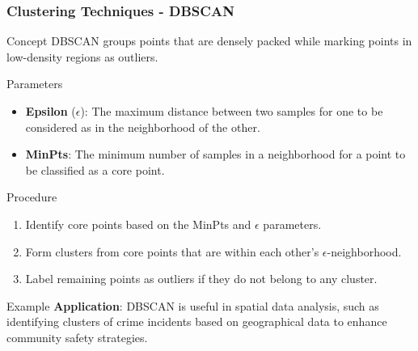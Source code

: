 \documentclass[aspectratio=169]{beamer}
\begin{document}
\begin{frame}[fragile]
    \frametitle{Clustering Techniques - DBSCAN}
    \begin{block}{Concept}
        DBSCAN groups points that are densely packed while marking points in low-density regions as outliers.
    \end{block}

    \begin{block}{Parameters}
        \begin{itemize}
            \item \textbf{Epsilon} (\( \epsilon \)): The maximum distance between two samples for one to be considered as in the neighborhood of the other.
            \item \textbf{MinPts}: The minimum number of samples in a neighborhood for a point to be classified as a core point.
        \end{itemize}
    \end{block}

    \begin{block}{Procedure}
        \begin{enumerate}
            \item Identify core points based on the MinPts and \( \epsilon \) parameters.
            \item Form clusters from core points that are within each other’s \( \epsilon \)-neighborhood.
            \item Label remaining points as outliers if they do not belong to any cluster.
        \end{enumerate}
    \end{block}
    
    \begin{block}{Example}
        \textbf{Application}: DBSCAN is useful in spatial data analysis, such as identifying clusters of crime incidents based on geographical data to enhance community safety strategies.
    \end{block}
\end{frame}
\end{document}
